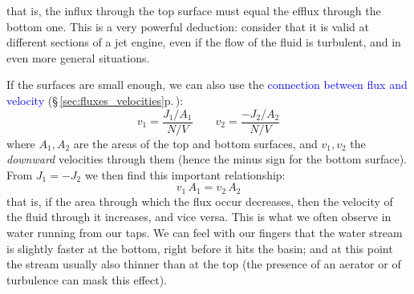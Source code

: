 \documentclass[a4paper,12pt,%
onecolumn,oneside,%
british%
]{memoir}
\renewcommand*{\|}[1][]{\nonscript\:#1\vert\nonscript\:\mathopen{}}
\newcommand*{\sect}{\S}%
\renewcommand*{\autoref}[3][\sect\,\ref]{\textcolor{blue}{#3} {\color{blue}\scriptsize(\faIcon[regular]{eye}\;#1{#2}\;p.\,\pageref{#2})}}
\newcommand*{\yN}{N}
\newcommand*{\yJ}{J}
\begin{document}
that is, the influx through the top surface must equal the efflux through the bottom one. This is a very powerful deduction: consider that it is valid at different sections of a jet engine, even if the flow of the fluid is turbulent, and in even more general situations.

\medskip

If the surfaces are small enough, we can also use the \autoref{sec:fluxes_velocities}{connection between flux and velocity}:
\begin{equation*}
  v_{1} = \frac{\yJ_{1}/A_{1}}{\yN/V}
  \qquad
  v_{2} = \frac{-\yJ_{2}/A_{2}}{\yN/V}
\end{equation*}
where $A_{1}, A_{2}$ are  the areas  of the top and bottom surfaces, and $v_{1}, v_{2}$ the \emph{downward} velocities through them (hence the minus sign for the bottom surface). From $\yJ_{1} = -\yJ_{2}$ we then find this important relationship:
\begin{equation*}
  v_{1}\,A_{1} = v_{2}\,A_{2}
\end{equation*}
that is, if the area through which the flux occur decreases, then the velocity of the fluid through it increases, and vice versa. This is what we often observe in water running from our taps. We can feel with our fingers that the water stream is slightly faster at the bottom, right before it hits the basin; and at this point the stream usually also thinner than at the top (the presence of an aerator or of turbulence can mask this effect).
%
%
\end{document}

